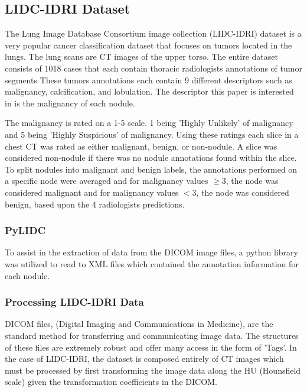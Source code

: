 \documentclass[10pt,twocolumn,letterpaper]{article}
\begin{document}
   \subsection{LIDC-IDRI Dataset} \label{sec:data-lidc}
      The Lung Image Database Consortium image collection (LIDC-IDRI) dataset
      is a very popular cancer classification dataset that focuses on tumors located
      in the lungs. The lung scans are CT images of the upper torso. The entire dataset
      consists of 1018 cases that each contain thoracic radiologists annotations of tumor segments
      These tumors annotations each contain 9 different descriptors such as malignancy,
      calcification, and lobulation. The descriptor this paper is interested in is the
      malignancy of each nodule.

      The malignancy is rated on a 1-5 scale. 1 being 'Highly Unlikely' of malignancy and
      5 being 'Highly Suspicious' of malignancy. Using these ratings each slice in a chest CT
      was rated as either malignant, benign, or non-nodule. A slice was considered non-nodule
      if there was no nodule annotations found within the slice. To split nodules into malignant
      and benign labels, the annotations performed on a specific node were averaged and for malignancy
      values $\ge 3$, the node was considered malignant and for malignancy values $< 3$, the node was
      considered benign, based upon the 4 radiologists predictions.

      \subsubsection{PyLIDC} \label{sec:data-lidc-pylidc}
         To assist in the extraction of data from the DICOM image files, a python library was utilized
         to read to XML files which contained the annotation information for each nodule. \cite{Hancock2018}

      \subsubsection{Processing LIDC-IDRI Data} \label{sec:data-lidc-processing}
         DICOM files, (Digital Imaging and Communications in Medicine), are the standard method for transferring
         and communicating image data. The structures of these files are extremely robust and offer many access in
         the form of 'Tags'. In the case of LIDC-IDRI, the dataset is composed entirely of CT images which must be
         processed by first transforming the image data along the HU (Hounsfield scale) given the transformation
         coefficients in the DICOM.
\end{document}
